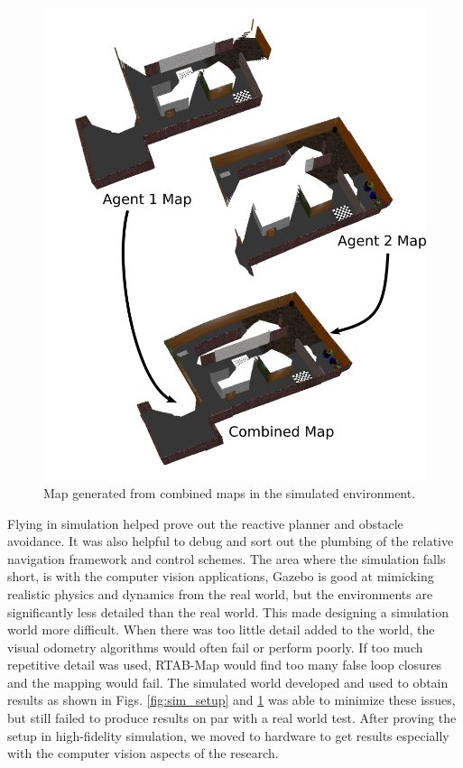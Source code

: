 \documentclass[letterpaper, 10 pt, conference]{ieeeconf}  %
\begin{document}
\begin{figure}
\centering
\includegraphics[width=1.0\linewidth]{sim_map}
\caption{Map generated from combined maps in the simulated environment.}
\label{fig:sim_map}
\end{figure}

Flying in simulation helped prove out the reactive planner and obstacle avoidance. It was also helpful to debug and sort out the plumbing of the relative navigation framework and control schemes. The area where the simulation falls short, is with the computer vision applications, Gazebo is good at mimicking realistic physics and dynamics from the real world, but the environments are significantly less detailed than the real world. This made designing a simulation world more difficult. When there was too little detail added to the world, the visual odometry algorithms would often fail or perform poorly. If too much repetitive detail was used, RTAB-Map would find too many false loop closures and the mapping would fail. The simulated world developed and used to obtain results as shown in Figs. \ref{fig:sim_setup} and \ref{fig:sim_map} was able to minimize these issues, but still failed to produce results on par with a real world test. After proving the setup in high-fidelity simulation, we moved to hardware to get results especially with the computer vision aspects of the research.
\end{document}
